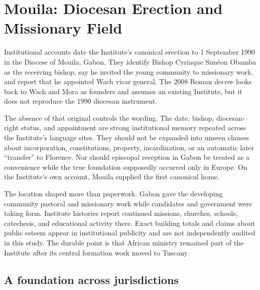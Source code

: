 \section{Mouila: Diocesan Erection and Missionary Field}

Institutional accounts date the Institute's canonical erection to 1 September 1990 in the Diocese of Mouila, Gabon. They identify Bishop Cyriaque Siméon Obamba as the receiving bishop, say he invited the young community to missionary work, and report that he appointed Wach vicar general. The 2008 Roman decree looks back to Wach and Mora as founders and assumes an existing Institute, but it does not reproduce the 1990 diocesan instrument.

The absence of that original controls the wording. The date, bishop, diocesan-right status, and appointment are strong institutional memory repeated across the Institute's language sites. They should not be expanded into unseen clauses about incorporation, constitutions, property, incardination, or an automatic later ``transfer'' to Florence. Nor should episcopal reception in Gabon be treated as a convenience while the true foundation supposedly occurred only in Europe. On the Institute's own account, Mouila supplied the first canonical home.

The location shaped more than paperwork. Gabon gave the developing community pastoral and missionary work while candidates and government were taking form. Institute histories report continued missions, churches, schools, catechesis, and educational activity there. Exact building totals and claims about public esteem appear in institutional publicity and are not independently audited in this study. The durable point is that African ministry remained part of the Institute after its central formation work moved to Tuscany.


\subsection{A foundation across jurisdictions}

